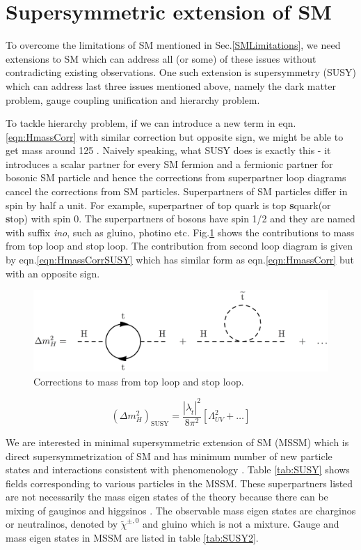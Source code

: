 \section{Supersymmetric extension of SM}
To overcome the limitations of SM mentioned in Sec.\ref{SMLimitations}, we need extensions to SM which can address all (or some) of these issues without contradicting existing observations. One such extension is supersymmetry (SUSY) which can address last three issues mentioned above, namely the dark matter problem, gauge coupling unification and hierarchy problem.

To tackle hierarchy problem, if we can introduce a new term in eqn.\ref{eqn:HmassCorr} with similar correction but opposite sign, we might be able to get \higgs mass around 125 \gev. Naively speaking, what SUSY does is exactly this - it introduces a scalar partner for every SM fermion and a fermionic partner for bosonic SM particle and hence the corrections from superpartner loop diagrams cancel the corrections from SM particles. Superpartners of SM particles differ in spin by half a unit. For example, superpartner of top quark is top \textbf{s}quark(or \textbf{s}top) with spin 0. The superpartners of bosons have spin 1/2 and they are named with suffix \textit{ino}, such as gluino, photino etc. Fig.\ref{fig:hierarchy_problem_higgs_mass_stop} shows the contributions to \higgs mass from top loop and stop loop. The contribution from second loop diagram is given by eqn.\ref{eqn:HmassCorrSUSY} which has similar form as eqn.\ref{eqn:HmassCorr} but with an opposite sign.
\begin{figure}[h!]
\centering
\includegraphics[width=0.8\linewidth]{../Figures/hierarchy_problem_higgs_mass_stop}
\caption{Corrections to \higgs mass from top loop and stop loop.}
\label{fig:hierarchy_problem_higgs_mass_stop}
\end{figure}
\begin{equation}
(\Delta m_{H}^2)_{\text{SUSY}} = \frac{|\lambda_{\tilde{t}}|^2}{8\pi^2}[\Lambda_{UV}^2 + \dots]
\label{eqn:HmassCorrSUSY}
\end{equation}

We are interested in minimal supersymmetric extension of SM (MSSM) which is direct supersymmetrization of SM and has minimum number of new particle states and interactions consistent with phenomenology \cite{baer_tata_2006}. Table \ref{tab:SUSY} shows fields corresponding to various particles in the MSSM. These superpartners listed are not necessarily the mass eigen states of the theory because there can be mixing of gauginos and higgsinos \cite{Martin:1997ns}. The observable mass eigen states are charginos or neutralinos, denoted by $\tilde{\chi}^{\pm,0}$ and gluino which is not a mixture. Gauge and mass eigen states in MSSM are listed in table \ref{tab:SUSY2}.

